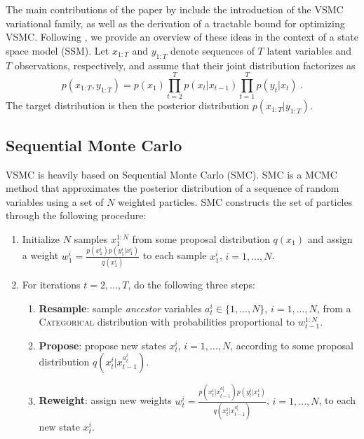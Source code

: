 \documentclass[12pt]{article}
\newcommand{\vsmc}{\textsc{VSMC}\xspace}
\newcommand{\smc}{\textsc{SMC}\xspace}
\newcommand{\mcmc}{\textsc{MCMC}\xspace}
\newcommand{\categorical}{\textsc{Categorical}\xspace}
\newcommand{\ssm}{\textsc{SSM}\xspace}
\begin{document}
The main contributions of the paper by \textcite{Naesseth:2018} include the introduction of the \vsmc variational family, as well as the derivation of a tractable bound for optimizing \vsmc. Following \parencite{Naesseth:2018}, we provide an overview of these ideas in the context of a state space model (\ssm). Let $x_{1:T}$ and $y_{1:T}$ denote sequences of $T$ latent variables and $T$ observations, respectively, and assume that their joint distribution factorizes as
\[
p(x_{1:T},y_{1:T}) = p(x_1)\prod_{t=2}^Tp(x_t|x_{t-1})\prod_{t=1}^Tp(y_t|x_t) \;.
\]
The target distribution is then the posterior distribution $p(x_{1:T}|y_{1:T})$.

\subsection{Sequential Monte Carlo}

\vsmc is heavily based on Sequential Monte Carlo (\smc). \smc is a \mcmc method that approximates the posterior distribution of a sequence of random variables using a set of $N$ weighted particles. \smc constructs the set of particles through the following procedure:
\begin{enumerate}

\item
Initialize $N$ samples $x_1^{1:N}$ from some proposal distribution $q(x_1)$ and assign a weight $w_1^i=\frac{p(x_1^i)p(y_1^i|x_1^i)}{q(x_1^i)}$ to each sample $x_1^i$, $i=1,...,N$.

\item
For iterations $t=2,...,T$, do the following three steps:
\begin{enumerate}

\item
\textbf{Resample}: sample \textit{ancestor} variables $a_t^i\in\{1,...,N\}$, $i=1,...,N$, from a \categorical distribution with probabilities proportional to $w_{t-1}^{1:N}$.

\item
\textbf{Propose}: propose new states $x_t^i$, $i=1,...,N$, according to some proposal distribution $q(x_t^i|x_{t-1}^{a_t^i})$.

\item
\textbf{Reweight}: assign new weights $w_t^i=\frac{p(x_t^i|x_{t-1}^{a_t^i})p(y_t^i|x_t^i)}{q(x_t^i|x_{t-1}^{a_t^i})}$, $i=1,...,N$, to each new state $x_t^i$.

\end{enumerate}

\end{enumerate}
\end{document}
